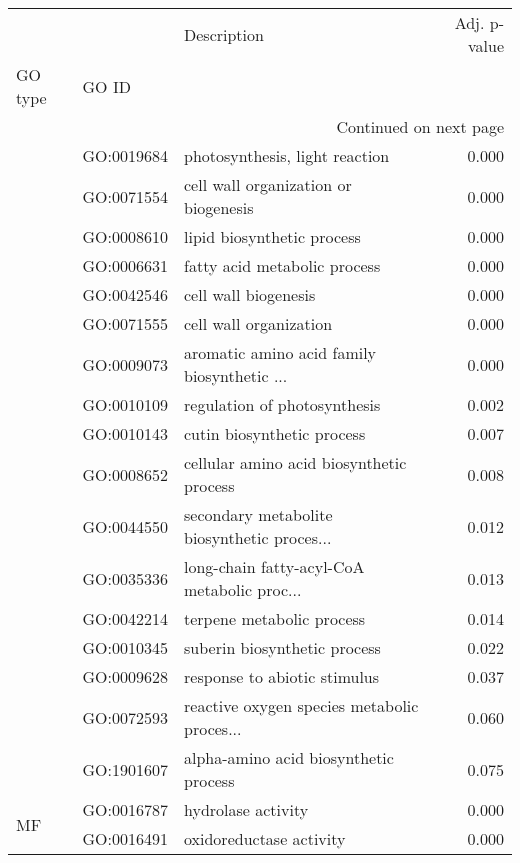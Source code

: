 \begin{longtable}{lllr}
\toprule
   &            &                                  Description &  Adj. p-value \\
GO type & GO ID &                                              &               \\
\midrule
\endhead
\midrule
\multicolumn{4}{r}{{Continued on next page}} \\
\midrule
\endfoot

\bottomrule
\endlastfoot
\multirow{17}{*}{BP} & GO:0019684 &               photosynthesis, light reaction &         0.000 \\
   & GO:0071554 &         cell wall organization or biogenesis &         0.000 \\
   & GO:0008610 &                   lipid biosynthetic process &         0.000 \\
   & GO:0006631 &                 fatty acid metabolic process &         0.000 \\
   & GO:0042546 &                         cell wall biogenesis &         0.000 \\
   & GO:0071555 &                       cell wall organization &         0.000 \\
   & GO:0009073 &  aromatic amino acid family biosynthetic ... &         0.000 \\
   & GO:0010109 &                 regulation of photosynthesis &         0.002 \\
   & GO:0010143 &                   cutin biosynthetic process &         0.007 \\
   & GO:0008652 &     cellular amino acid biosynthetic process &         0.008 \\
   & GO:0044550 &  secondary metabolite biosynthetic proces... &         0.012 \\
   & GO:0035336 &  long-chain fatty-acyl-CoA metabolic proc... &         0.013 \\
   & GO:0042214 &                    terpene metabolic process &         0.014 \\
   & GO:0010345 &                 suberin biosynthetic process &         0.022 \\
   & GO:0009628 &                 response to abiotic stimulus &         0.037 \\
   & GO:0072593 &  reactive oxygen species metabolic proces... &         0.060 \\
   & GO:1901607 &        alpha-amino acid biosynthetic process &         0.075 \\
\cline{1-4}
\multirow{2}{*}{MF} & GO:0016787 &                           hydrolase activity &         0.000 \\
   & GO:0016491 &                      oxidoreductase activity &         0.000 \\
\end{longtable}
